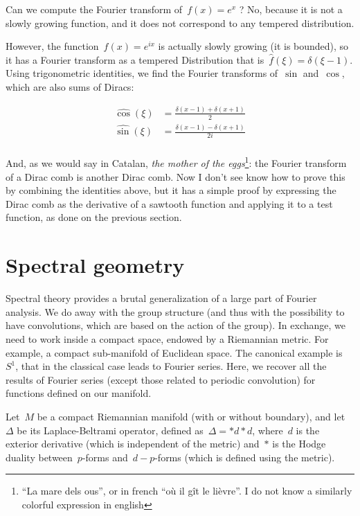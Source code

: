 Can we compute the Fourier transform of~$f(x)=e^x$ ?  No, because it
is not a slowly growing function, and it does not correspond to any
tempered distribution.

However, the function~$f(x)=e^{ix}$ is actually slowly growing (it is
bounded), so it has a Fourier transform as a tempered Distribution
that is~$\widehat{f}(\xi)=\delta(\xi-1)$.  Using trigonometric
identities, we find the Fourier transforms of~$\sin$ and~$\cos$,
which are also sums of Diracs:

\begin{eqnarray*}
	\widehat{\cos}(\xi) &=\frac{\delta(x-1)+\delta(x+1)}{2} \\
	\widehat{\sin}(\xi) &=\frac{\delta(x-1)-\delta(x+1)}{2i} \\
\end{eqnarray*}

And, as we would say in Catalan, \emph{the mother of the
eggs}\footnote{``La mare dels ous'', or in french ``où il gît le
lièvre''.  I do not know a similarly colorful expression in english}: the
Fourier transform of a Dirac comb is another Dirac comb.
Now I don't see
know how to prove this by combining the identities above, but it has
a simple proof by expressing the Dirac comb as the derivative of a
sawtooth function and applying it to a test function, as done on the
previous section.

\section{Spectral geometry}

Spectral theory provides a brutal generalization of a large part of
Fourier analysis.  We do away with the group structure (and thus with
the possibility to have convolutions, which are based on the action
of the group).  In exchange, we need to work inside a compact space,
endowed by a Riemannian metric.  For example, a compact sub-manifold
of Euclidean space.  The canonical example is~$S^1$, that in
the classical case leads to Fourier series.  Here, we recover all
the results of Fourier series (except those related to periodic
convolution) for functions defined on our manifold.

Let~$M$ be a compact Riemannian manifold (with or without boundary), and
let~$\Delta$ be its Laplace-Beltrami operator, defined
as~$\Delta=*d*d$, where~$d$ is the exterior derivative (which is independent
of the metric) and~$*$ is the Hodge duality between~$p$-forms
and~$d-p$-forms (which is defined using the metric).

